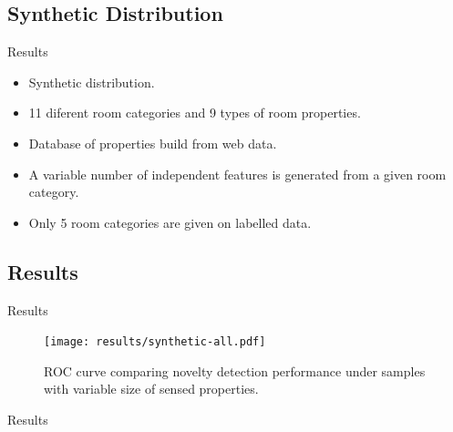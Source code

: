 \documentclass[compress]{beamer}
\begin{document}
\subsection{Synthetic Distribution}
\begin{frame}
    {Results}
    \begin{itemize}
        \item Synthetic distribution.
        \item 11 diferent room categories and 9 types of room properties.
        \item Database of properties build from web data.
        \item A variable number of independent features is generated from a given room category.
        \item Only 5 room categories are given on labelled data.
    \end{itemize}
\end{frame}

\subsection{Results}
\begin{frame}{Results}
    \begin{figure}[h]
    \centering
    \texttt{[image: results/synthetic-all.pdf]}

    \caption{\label{fig:synthetic-roc}ROC curve comparing novelty detection performance
             under samples with variable size of sensed properties.}
    \end{figure}
\end{frame}


\begin{frame}{Results}
    \begin{figure}[h]
        \centering

        \qquad

        \qquad

    \end{figure}
\end{frame}
\end{document}
